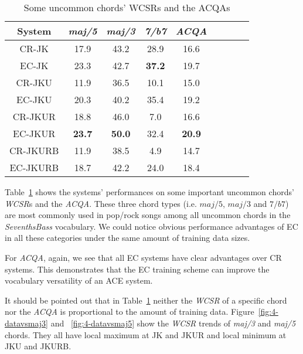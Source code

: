  \label{sec:4-scper}
\begin{table}[htb]
	\caption{Some uncommon chords' WCSRs and the ACQAs}
	\label{tab:4-ltres}
	\centering
	\scriptsize
	\begin{tabular}{|c|c|c|c|c|c|c|c|c|}\hline
		System & \textit{maj/5} & \textit{maj/3} & \textit{7/b7} & \textit{ACQA}\\ \hline
		CR-JK & 17.9 & 43.2 & 28.9 & 16.6\\ \hline
		EC-JK & 23.3 & 42.7 & \textbf{37.2} & 19.7\\ \hline
		CR-JKU & 11.9 & 36.5 & 10.1 & 15.0\\ \hline
		EC-JKU & 20.3 & 40.2 & 35.4 & 19.2\\ \hline
		CR-JKUR & 18.8 & 46.0 & 7.0 & 16.6\\ \hline
		EC-JKUR & \textbf{23.7} & \textbf{50.0} & 32.4 & \textbf{20.9}\\ \hline
		CR-JKURB & 11.9 & 38.5 & 4.9 & 14.7\\ \hline
		EC-JKURB & 18.7 & 42.2 & 24.0 & 18.4\\ \hline
	\end{tabular}
\end{table}
Table~\ref{tab:4-ltres} shows the systems' performances on some important uncommon chords' \textit{WCSR}s and the \textit{ACQA}. These three chord types (i.e. $maj/5$, $maj/3$ and $7/b7$) are most commonly used in pop/rock songs among all uncommon chords in the \textit{SeventhsBass} vocabulary. We could notice obvious performance advantages of EC in all these categories under the same amount of training data sizes.

For \textit{ACQA}, again, we see that all EC systems have clear advantages over CR systems. This demonstrates that the EC training scheme can improve the vocabulary versatility of an ACE system.

It should be pointed out that in Table~\ref{tab:4-ltres} neither the \textit{WCSR} of a specific chord nor the \textit{ACQA} is proportional to the amount of training data. Figure~\ref{fig:4-datavsmaj3} and ~\ref{fig:4-datavsmaj5} show the \textit{WCSR} trends of \textit{maj/3} and \textit{maj/5} chords. They all have local maximum at JK and JKUR and local minimum at JKU and JKURB.


